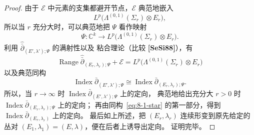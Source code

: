 \begin{proof}
由于 $\mathcal E$ 中元素的支集都避开节点，$\mathcal E$ 典范地嵌入
\[
L^p\bigl(\Lambda^{(0,1)}(\Sigma_r)\otimes E_r\bigr),
\]
所以当 $r$ 充分大时，可以典范地把 $\Psi$ 看作映射
\[
\Psi\colon\mathbb C^k\longrightarrow
L^p\bigl(\Lambda^{(0,1)}(\Sigma_r)\otimes E_r\bigr).
\]
利用 $\widehat{\bar\partial}_{(E',\lambda');\Psi}$ 的满射性以及
粘合理论（比较 \textbf{[SeSi88]}），有
\[
\operatorname{Range}
\widehat{\bar\partial}_{(E_r,\lambda_r);\Psi}+\mathcal E
=L^p\bigl(\Lambda^{(0,1)}(\Sigma_r)\otimes E_r\bigr)
\]
以及典范同构
\[
\operatorname{Index}\bar\partial_{(E',\lambda');\Psi}
\cong
\operatorname{Index}\bar\partial_{(E_r,\lambda_r);\Psi}.
\]
所以，当 $r\to\infty$ 时
$\operatorname{Index}\bar\partial_{(E',\lambda');\Psi}$ 上的定向，
典范地给出充分大 $r>0$ 时
$\operatorname{Index}\bar\partial_{(E_r,\lambda_r);\Psi}$ 上的定向；
再由同构~\eqref{eq:8-1-star} 的第一部分，得到
$\operatorname{Index}\bar\partial_{(E_r,\lambda_r)}$ 上的定向。
最后如上所述，把 $(E_r,\lambda_r)$ 连续形变到原先给定的丛对
$(E_1,\lambda_1)=(E,\lambda)$，便在后者上诱导出定向。
证明完毕。
\end{proof}

